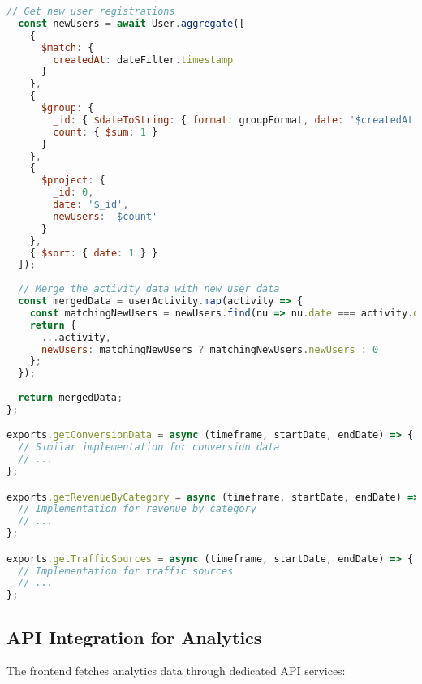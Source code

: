 \documentclass[12pt,a4paper]{article}
\begin{document}
\begin{lstlisting}[language=JavaScript]
  // Get new user registrations
  const newUsers = await User.aggregate([
    { 
      $match: {
        createdAt: dateFilter.timestamp
      }
    },
    {
      $group: {
        _id: { $dateToString: { format: groupFormat, date: '$createdAt' } },
        count: { $sum: 1 }
      }
    },
    {
      $project: {
        _id: 0,
        date: '$_id',
        newUsers: '$count'
      }
    },
    { $sort: { date: 1 } }
  ]);
  
  // Merge the activity data with new user data
  const mergedData = userActivity.map(activity => {
    const matchingNewUsers = newUsers.find(nu => nu.date === activity.date);
    return {
      ...activity,
      newUsers: matchingNewUsers ? matchingNewUsers.newUsers : 0
    };
  });
  
  return mergedData;
};

exports.getConversionData = async (timeframe, startDate, endDate) => {
  // Similar implementation for conversion data
  // ...
};

exports.getRevenueByCategory = async (timeframe, startDate, endDate) => {
  // Implementation for revenue by category
  // ...
};

exports.getTrafficSources = async (timeframe, startDate, endDate) => {
  // Implementation for traffic sources
  // ...
};
\end{lstlisting}

\subsection{API Integration for Analytics}
The frontend fetches analytics data through dedicated API services:
\end{document}
